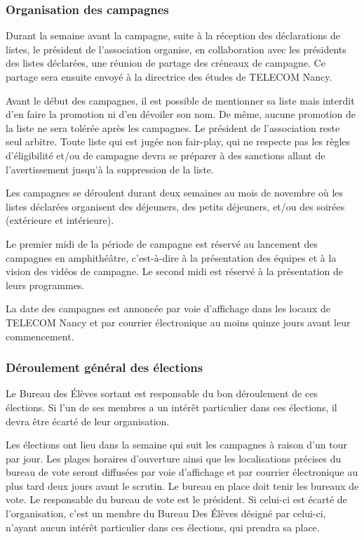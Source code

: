\documentclass{article} %
\begin{document}
			\clearpage

			\subsubsection{Organisation des campagnes}

				Durant la semaine avant la campagne, suite à la réception des
				déclarations de listes, le président de l’association organise,
				en collaboration avec les présidents des listes déclarées, une
				réunion de partage des créneaux de campagne. Ce partage sera
				ensuite envoyé à la directrice des études de TELECOM Nancy.

				Avant le début des campagnes, il est possible de mentionner sa
				liste mais interdit d’en faire la promotion ni d'en dévoiler son
				nom. De même, aucune promotion de la liste ne sera tolérée après
				les campagnes. Le président de l’association reste seul arbitre.
				Toute liste qui est jugée non fair-play, qui ne respecte pas les
				règles d’éligibilité et/ou de campagne devra se préparer à des
				sanctions allant de l’avertissement jusqu'à la suppression de la
				liste.

				Les campagnes se déroulent durant deux semaines
				au mois de novembre où les listes déclarées
				organisent des déjeuners, des petits déjeuners, et/ou des
				soirées (extérieure et intérieure).
				
				Le premier midi de la période de campagne est réservé au
				lancement des campagnes en amphithéâtre, c’est-à-dire à la
				présentation des équipes et à la vision des vidéos de campagne.
				Le second midi est réservé à la présentation de leurs
				programmes.

				La date des campagnes est annoncée par voie d’affichage dans les
				locaux de TELECOM Nancy et par courrier électronique au moins
				quinze jours avant leur commencement.

			\subsubsection{Déroulement général des élections}

				Le Bureau des Élèves sortant est responsable du bon déroulement
				de ces élections. Si l'un de ses membres a un intérêt
				particulier dans ces élections, il devra être écarté de leur
				organisation.

				Les élections ont lieu dans la semaine qui suit les campagnes à
				raison d’un tour par jour. Les plages horaires d’ouverture ainsi
				que les localisations précises du bureau de vote seront
				diffusées par voie d’affichage et par courrier électronique au
				plus tard deux jours avant le scrutin. Le bureau en place doit
				tenir les bureaux de vote. Le responsable du bureau de vote est
				le président. Si celui-ci est écarté de l’organisation, c'est un
				membre du Bureau Des Élèves désigné par celui-ci, n'ayant aucun
				intérêt particulier dans ces élections, qui prendra sa place.
\end{document}
